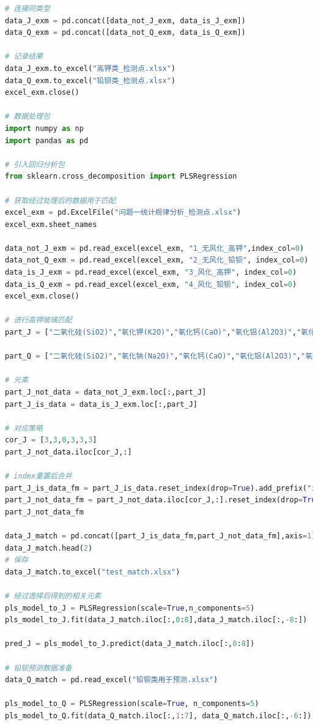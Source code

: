 \documentclass[withoutpreface,bwprint]{cumcmthesis} %
\begin{document}
\begin{appendices}
\begin{lstlisting}[language=python]
# 连接同类型
data_J_exm = pd.concat([data_not_J_exm, data_is_J_exm])
data_Q_exm = pd.concat([data_not_Q_exm, data_is_Q_exm])

# 记录结果
data_J_exm.to_excel("高钾类_检测点.xlsx")
data_Q_exm.to_excel("铅钡类_检测点.xlsx")
excel_exm.close()

# 数据处理包
import numpy as np
import pandas as pd

# 引入回归分析包
from sklearn.cross_decomposition import PLSRegression

# 获取经过处理后的数据用于匹配
excel_exm = pd.ExcelFile("问题一统计规律分析_检测点.xlsx")
excel_exm.sheet_names

data_not_J_exm = pd.read_excel(excel_exm, "1_无风化_高钾",index_col=0)
data_not_Q_exm = pd.read_excel(excel_exm, "2_无风化_铅钡", index_col=0)
data_is_J_exm = pd.read_excel(excel_exm, "3_风化_高钾", index_col=0)
data_is_Q_exm = pd.read_excel(excel_exm, "4_风化_铅钡", index_col=0)
excel_exm.close()

# 进行高钾玻璃匹配
part_J = ["二氧化硅(SiO2)","氧化钾(K2O)","氧化钙(CaO)","氧化铝(Al2O3)","氧化镁(MgO)","氧化铁(Fe2O3)","氧化铅(PbO)","五氧化二磷(P2O5)"]

part_Q = ["二氧化硅(SiO2)","氧化钠(Na2O)","氧化钙(CaO)","氧化铝(Al2O3)","氧化铅(PbO)","五氧化二磷(P2O5)"]

# 元素
part_J_not_data = data_not_J_exm.loc[:,part_J]
part_J_is_data = data_is_J_exm.loc[:,part_J]

# 对应策略
cor_J = [3,3,0,3,3,3]
part_J_not_data.iloc[cor_J,:]

# index重置后合并
part_J_is_data_fm = part_J_is_data.reset_index(drop=True).add_prefix("is_")
part_J_not_data_fm = part_J_not_data.iloc[cor_J,:].reset_index(drop=True).add_prefix("not_")
part_J_not_data_fm

data_J_match = pd.concat([part_J_is_data_fm,part_J_not_data_fm],axis=1)
data_J_match.head(2)
# 保存
data_J_match.to_excel("test_match.xlsx")

# 经过选择后得到的相关元素
pls_model_to_J = PLSRegression(scale=True,n_components=5)
pls_model_to_J.fit(data_J_match.iloc[:,0:8],data_J_match.iloc[:,-8:])

pred_J = pls_model_to_J.predict(data_J_match.iloc[:,0:8])

# 铅钡预测数据准备
data_Q_match = pd.read_excel("铅钡类用于预测.xlsx")

pls_model_to_Q = PLSRegression(scale=True, n_components=5)
pls_model_to_Q.fit(data_Q_match.iloc[:,1:7], data_Q_match.iloc[:,-6:])


\end{lstlisting}
\end{appendices}
\end{document}
